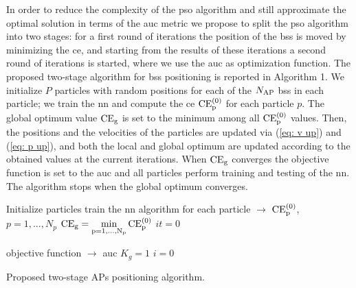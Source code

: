 \documentclass[conference]{IEEEtran}
\begin{document}
In order to reduce the complexity of the \ac{pso} algorithm and still approximate the optimal solution in terms of the \ac{auc} metric we propose to split the \ac{pso} algorithm into two stages: for a first round of iterations the position of the \acp{bs} is moved by minimizing the \ac{ce}, and starting from the results of these iterations a second round  of iterations is started, where we use the \ac{auc} as optimization function. 
The proposed two-stage algorithm for \acp{bs} positioning is reported in Algorithm 1. We initialize $P$ particles with random positions for each of the $N_{\rm AP}$ \acp{bs} in each particle; we train the \ac{nn} and compute the \ac{ce} $\rm{CE}_p^{(0)}$ for each particle $p$. The global optimum value $\rm{CE}_g$ is set to the minimum among all $\rm{CE}_p^{(0)}$ values. Then, the positions and the velocities of the particles are updated via (\ref{eq: v up}) and (\ref{eq: p up}), and both the local and global optimum are updated according to the obtained values at the current iterations. When $\rm{CE}_g$ converges the objective function is set to the \ac{auc} and all particles perform  training and testing of the \ac{nn}. The algorithm stops when the global optimum converges.

 \begin{algorithm}[b!]

\small

  Initialize particles\;
  train the \ac{nn} algorithm for each particle $\to$ $\rm{CE}_p^{(0)}$, $p=1,...,N_p$\;
  $\rm{CE}_g=\underset{p=1,...,N_p}{min} \, \rm{CE}_p^{(0)}$\;
  $it = 0$\;

      
      objective function $\to$ \ac{auc}\;
      $K_g = 1$\;
      $i = 0$\;
    
\caption{Proposed two-stage APs positioning algorithm.}
 \end{algorithm}
\end{document}

